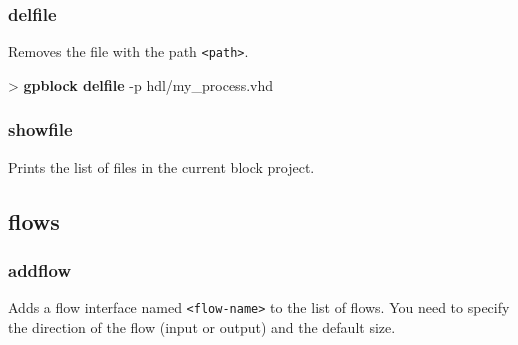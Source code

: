 \documentclass[10pt,a4paper]{article}
\begin{document}

\subsubsection{delfile}
\label{subsec:delfile}

Removes the file with the path \texttt{<path>}.\\


\begin{sampletitle}
> \textbf{gpblock delfile} -p hdl/my\_process.vhd
\end{sampletitle}


\subsubsection{showfile}
\label{subsec:showfile}

Prints the list of files in the current block project.

\subsection{flows}
\subsubsection{addflow}
\label{subsec:addflow}

Adds a flow interface named \texttt{<flow-name>} to the list of flows. You need to specify the direction of the flow (input or output) and the default size.\\

\end{document}
